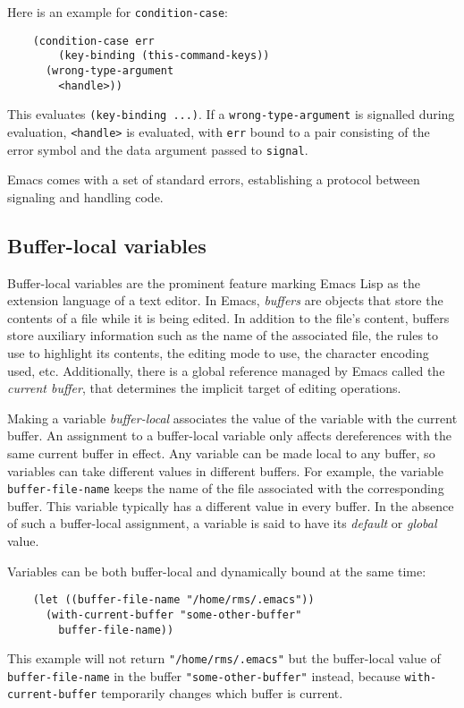 \documentclass[format=acmsmall, review]{acmart}
\newcommand \Elisp {Emacs Lisp}
\begin{document}
Here is an example for \texttt{condition-case}:
\begin{verbatim}
    (condition-case err
        (key-binding (this-command-keys))
      (wrong-type-argument
        <handle>))
\end{verbatim}
This evaluates \texttt{(key-binding ...)}.  If a
\texttt{wrong-type-argument} is signalled during evaluation,
\texttt{<handle>} is evaluated, with \texttt{err} bound to a pair
consisting of the error symbol and the data argument passed to
\texttt{signal}.

Emacs comes with a set of standard errors, establishing a protocol
between signaling and handling code.

\subsection{Buffer-local variables}
\label{sec:buffer-local-variables}

Buffer-local variables are the prominent feature marking \Elisp{} as the
extension language of a text editor.  In Emacs, \emph{buffers} are objects
that store the contents of a file while it is being edited.  In addition to
the file's content, buffers store auxiliary information such
as the name of the associated file, the rules to use to highlight its
contents, the editing mode to use, the character encoding used, etc.
Additionally, there is a global reference managed by Emacs called the
\emph{current buffer}, that determines the implicit target of
editing operations.

Making a variable \emph{buffer-local} associates the value of the variable
with the current buffer.  An assignment to a buffer-local variable
only affects dereferences with the same current buffer in effect.
Any variable can be made local to any buffer, so variables can take
different values in different buffers.  For example, the variable
\texttt{buffer-file-name} keeps the name of the file associated with the
corresponding buffer.  This variable typically has a different value in
every buffer.  In the absence of such a buffer-local assignment, a variable
is said to have its \emph{default} or \emph{global} value.

Variables can be both buffer-local and dynamically bound at the same time:
\begin{verbatim}
    (let ((buffer-file-name "/home/rms/.emacs"))
      (with-current-buffer "some-other-buffer"
        buffer-file-name))
\end{verbatim}
This example will not return \texttt{"/home/rms/.emacs"} but the
buffer-local value of \texttt{buffer-file-name} in the buffer
\texttt{"some-other-buffer"} instead, because \texttt{with-current-buffer}
temporarily changes which buffer is current.
\end{document}
